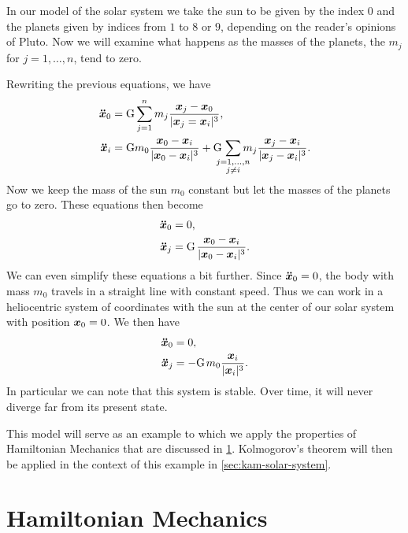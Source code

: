 \documentclass[twoside,letterpaper,11pt]{article}
\numberwithin{equation}{section}
\begin{document}
In our model of the solar system we take the sun to be given by the index $0$
and the planets given by indices from $1$ to $8$ or $9$, depending on the
reader's opinions of Pluto.
Now we will examine what happens as the masses of the planets, the $m_j$ for $j
= 1, \ldots, n$, tend to zero.

Rewriting the previous equations, we have
\begin{align*}
  \bdd{x}_0 &= \mathrm{G} \sum_{j = 1}^n m_j \frac{\bp{x}_j -
              \bp{x}_0}{|\bp{x}_j = \bp{x}_i|^3},\\
  \bdd{x}_i &= \mathrm{G} m_0 \frac{\bp{x}_0 - \bp{x}_i}{|\bp{x}_0 -
              \bp{x}_i|^3} + \mathrm{G} \nobreak\hspace{.125em plus
              .14286em}
              \sum_{\mathclap{\substack{j=1,\ldots,n\\j\neq i}}}
              m_j \frac{\bp{x}_j - \bp{x}_i}{|\bp{x}_j - \bp{x}_i|^3}.
\end{align*}
Now we keep the mass of the sun $m_0$ constant but let the masses of the planets
go to zero.
These equations then become
\begin{align*}
  \bdd{x}_0 &= 0,\\
  \bdd{x}_j &= \mathrm{G} \nobreak\hspace{.125em plus .14286em} \frac{\bp{x}_0 -
              \bp{x}_i}{|\bp{x}_0 - \bp{x}_i|^3}.
\end{align*}
We can even simplify these equations a bit further.
Since $\bm{\ddot{x}}_0 = 0$, the body with mass $m_0$ travels in a straight line with
constant speed.
Thus we can work in a heliocentric system of coordinates with the sun at the
center of our solar system with position $\bm{x}_0 = 0$.
We then have
\begin{align*}
  \bdd{x}_0 &= 0,\\
  \bdd{x}_j &= - \mathrm{G} \nobreak\hspace{.125em plus .14286em}
              m_0 \frac{\bp{x}_i}{|\bp{x}_i|^3}.
\end{align*}
In particular we can note that this system is stable.
Over time, it will never diverge far from its present state.

This model will serve as an example to which we apply the properties of
Hamiltonian Mechanics that are discussed in \cref{sec:hamilt-mech}.
Kolmogorov's theorem will then be applied in the context of this example in
\cref{sec:kam-solar-system}.

\section{Hamiltonian Mechanics}
\label{sec:hamilt-mech}
\end{document}
